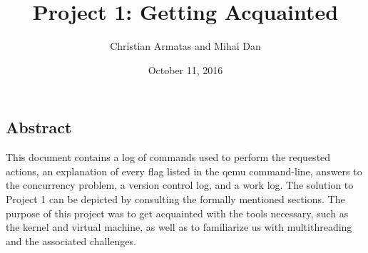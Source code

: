 \documentclass[letterpaper,10pt,onecolumn]{IEEEtran}
\title{Project 1: Getting Acquainted}
\author{Christian Armatas and Mihai Dan}
\date{October 11, 2016}
\begin{document}
    \begin{center}
        \begin{minipage}[h]{\textwidth}
            \maketitle
        \end{minipage}
    \end{center}
    
    \begin{center}
        \section*{Abstract}
        This document contains a log of commands used to perform the requested actions, an explanation of every flag listed in the qemu command-line, answers to the concurrency problem, a version control log, and a work log. The solution to Project 1 can be depicted by consulting the formally mentioned sections. The purpose of this project was to get acquainted with the tools necessary, such as the kernel and virtual machine, as well as to familiarize us with multithreading and the associated challenges. 
    \end{center}
    
    \newpage
    
\end{document}
